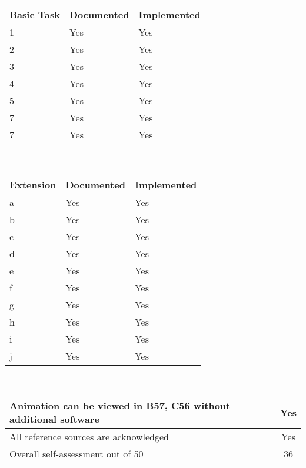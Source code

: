 \documentclass[titlepage]{article}
\begin{document}
 \begin{tabularx}{0.5\columnwidth}{| X | X | X |}
            \hline
            Basic Task & Documented & Implemented \\
            \hline
            1 & Yes & Yes \\
            \hline
            2 & Yes & Yes\\
            \hline
            3 & Yes & Yes \\
            \hline
            4 & Yes & Yes \\
            \hline
            5 & Yes & Yes \\
            \hline
            7 & Yes & Yes \\
            \hline
            7 & Yes & Yes \\
            \hline
        \end{tabularx} \\

        \vspace{1em}
        \begin{tabularx}{0.5\columnwidth}{| X | X | X |}
            \hline
            Extension & Documented & Implemented \\
            \hline
            a & Yes & Yes \\
            \hline
            b & Yes & Yes \\
            \hline
            c &Yes & Yes \\
            \hline
            d &Yes & Yes \\
            \hline
            e & Yes & Yes \\
            \hline
            f & Yes & Yes \\
            \hline
            g & Yes & Yes \\
            \hline
            h & Yes & Yes \\
            \hline
            i & Yes & Yes \\
            \hline
            j & Yes & Yes \\
            \hline
        \end{tabularx} \\

       
        \vspace{1em}
        \begin{tabularx}{0.5\columnwidth}{| X | c |}
            \hline
            Animation can be viewed in B57, C56 without additional software & Yes \\
            \hline
            All reference sources are acknowledged & Yes \\
            \hline
            Overall self-assessment out of 50 & 36 \\
            \hline
        \end{tabularx}
\end{document}
